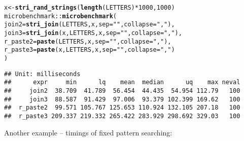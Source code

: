 \documentclass[nojss]{jss}\usepackage[]{graphicx}\usepackage[]{xcolor}
\makeatletter
\newcommand{\hlnum}[1]{\textcolor[rgb]{0.686,0.059,0.569}{#1}}%
\newcommand{\hlstr}[1]{\textcolor[rgb]{0.192,0.494,0.8}{#1}}%
\newcommand{\hlopt}[1]{\textcolor[rgb]{0,0,0}{#1}}%
\newcommand{\hlstd}[1]{\textcolor[rgb]{0.345,0.345,0.345}{#1}}%
\newcommand{\hlkwb}[1]{\textcolor[rgb]{0.69,0.353,0.396}{#1}}%
\newcommand{\hlkwc}[1]{\textcolor[rgb]{0.333,0.667,0.333}{#1}}%
\newcommand{\hlkwd}[1]{\textcolor[rgb]{0.737,0.353,0.396}{\textbf{#1}}}%
\newenvironment{kframe}{%
 \def\at@end@of@kframe{}%
 \ifinner\ifhmode%
  \def\at@end@of@kframe{\end{minipage}}%
  \begin{minipage}{\columnwidth}%
 \fi\fi%
 \def\FrameCommand##1{\hskip\@totalleftmargin \hskip-\fboxsep
 \colorbox{shadecolor}{##1}\hskip-\fboxsep
     \hskip-\linewidth \hskip-\@totalleftmargin \hskip\columnwidth}%
 \MakeFramed {\advance\hsize-\width
   \@totalleftmargin\z@ \linewidth\hsize
   \@setminipage}}%
 {\par\unskip\endMakeFramed%
 \at@end@of@kframe}
\newenvironment{knitrout}{}{} %
\makeatother
\begin{document}
\begin{knitrout}
\color{fgcolor}\begin{kframe}
\begin{alltt}
\hlstd{x} \hlkwb{<-} \hlkwd{stri_rand_strings}\hlstd{(}\hlkwd{length}\hlstd{(LETTERS)} \hlopt{*} \hlnum{1000}\hlstd{,} \hlnum{1000}\hlstd{)}
\hlstd{microbenchmark}\hlopt{::}\hlkwd{microbenchmark}\hlstd{(}
  \hlkwc{join2}\hlstd{=}\hlkwd{stri_join}\hlstd{(LETTERS, x,} \hlkwc{sep}\hlstd{=}\hlstr{""}\hlstd{,} \hlkwc{collapse}\hlstd{=}\hlstr{", "}\hlstd{),}
  \hlkwc{join3}\hlstd{=}\hlkwd{stri_join}\hlstd{(x, LETTERS, x,} \hlkwc{sep}\hlstd{=}\hlstr{""}\hlstd{,} \hlkwc{collapse}\hlstd{=}\hlstr{", "}\hlstd{),}
  \hlkwc{r_paste2}\hlstd{=}\hlkwd{paste}\hlstd{(LETTERS, x,} \hlkwc{sep}\hlstd{=}\hlstr{""}\hlstd{,} \hlkwc{collapse}\hlstd{=}\hlstr{", "}\hlstd{),}
  \hlkwc{r_paste3}\hlstd{=}\hlkwd{paste}\hlstd{(x, LETTERS, x,} \hlkwc{sep}\hlstd{=}\hlstr{""}\hlstd{,} \hlkwc{collapse}\hlstd{=}\hlstr{", "}\hlstd{)}
\hlstd{)}
\end{alltt}
\begin{verbatim}
## Unit: milliseconds
##      expr     min      lq    mean  median      uq    max neval
##     join2  38.709  41.789  56.454  44.435  54.954 112.79   100
##     join3  88.587  91.429  97.006  93.379 102.399 169.62   100
##  r_paste2  99.571 105.767 125.653 110.924 132.105 207.18   100
##  r_paste3 209.337 219.332 265.422 283.929 298.692 329.03   100
\end{verbatim}
\end{kframe}
\end{knitrout}

Another example -- timings of fixed pattern searching:
\end{document}
